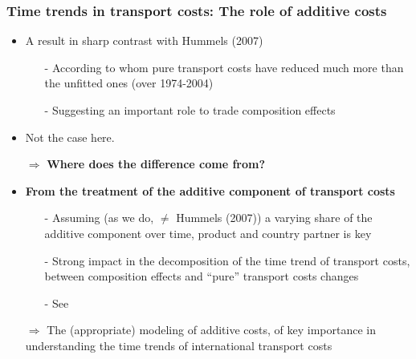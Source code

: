 \documentclass[10 pt,Helvetica, french]{beamer}
\begin{document}
\begin{frame}[label = slide_compeffects_results]
\frametitle{Time trends in transport costs: The role of additive costs}
\begin{itemize}
\item A result in sharp contrast with Hummels (2007) \vspace{0.1cm}
\begin{itemize}
\item[-] According to whom pure transport costs have reduced much more than the unfitted ones (over 1974-2004) \vspace{0.1cm}
\item[-] Suggesting an important role to trade composition effects  \vspace{0.1cm}
\end{itemize}
\item Not the case here. \vspace{0.1cm}
\item[$\Rightarrow$] \textbf{Where does the difference come from?} \vspace{0.1cm}
\item \textbf{From the treatment of the additive component of transport costs} \vspace{0.1cm}
\begin{itemize}
\item[-] Assuming (as we do, $\neq$ Hummels (2007)) a varying share of the additive component over time, product and country partner is key \vspace{0.1cm}
\item[-] Strong impact in the decomposition of the time trend of transport costs, between composition effects and ``pure'' transport costs changes \vspace{0.1cm}
\item[-] See  \hyperlink{app_compeffects_results}{}
\end{itemize}\vspace{0.1cm}
\item[$\Rightarrow$] The (appropriate) modeling of additive costs, of key importance in understanding the time trends of international transport costs
\end{itemize}

\end{frame}
\end{document}
